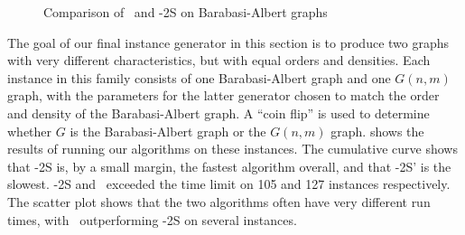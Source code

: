 \begin{figure}[htb]
    \centering
    \caption{Comparison of \McSplit\ and \McSplit-2S on Barabasi-Albert graphs}
    \label{figure:mcsplit-vs-mcsplit2-ba}
\end{figure}

The goal of our final instance generator in this section is to produce two graphs with very different
characteristics, but with equal orders and densities.  Each instance in this family
consists of one Barabasi-Albert graph and one $G(n,m)$ graph, with the parameters for the latter
generator chosen to match the order and density of the Barabasi-Albert graph.  A ``coin flip''
is used to determine whether $G$ is the Barabasi-Albert graph or the $G(n,m)$ graph.
shows the results of running our algorithms on these instances.  The cumulative curve shows that \McSplit-2S is, by a small margin, the
fastest algorithm overall, and that \McSplit-2S' is the slowest.  \McSplit-2S and \McSplit\ exceeded
the time limit on 105 and 127 instances respectively.  The scatter plot shows that the two
algorithms often have very different run times, with \McSplit\ outperforming \McSplit-2S on several instances.

